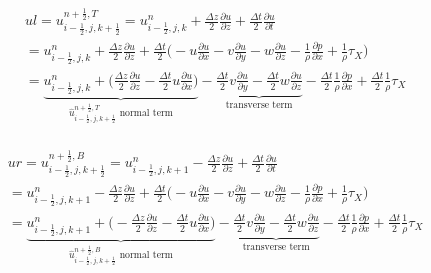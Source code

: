 \documentclass{article}
\numberwithin{equation}{subsection}
\begin{document}
\begin{align}
\begin{split}
& ul = u_{i-\frac{1}{2},j,k+\frac{1}{2}}^{n+\frac{1}{2},T} = u_{i-\frac{1}{2},j,k}^n + \frac{\Delta z}{2}\frac{\partial u}{\partial z} + \frac{\Delta t}{2}\frac{\partial u}{\partial t} \\
&= u_{i-\frac{1}{2},j,k}^n + \frac{\Delta z}{2} \frac{\partial u}{\partial z} + \frac{\Delta t}{2} \Big( -u\frac{\partial u}{\partial x} -v\frac{\partial u}{\partial y} -w\frac{\partial u}{\partial z} - \frac{1}{\rho}\frac{\partial p}{\partial x} +\frac{1}{\rho}\tau_X\Big) \\
&= \underbrace{u_{i-\frac{1}{2},j,k}^n + \Big(\frac{\Delta z}{2}\frac{\partial u}{\partial z} - \frac{\Delta t}{2} u\frac{\partial u}{\partial x}\Big)}_\text{$\widehat{u}_{i-\frac{1}{2},j,k+\frac{1}{2}}^{n+\frac{1}{2},T}$ normal term} -\underbrace{\frac{\Delta t}{2}v\frac{\partial u}{\partial y} - \frac{\Delta t}{2}w\frac{\partial u}{\partial z}}_\text{transverse term} - \frac{\Delta t}{2}\frac{1}{\rho}\frac{\partial p}{\partial x} + \frac{\Delta t}{2}\frac{1}{\rho}\tau_X
\end{split}
\end{align}

\begin{align}
\begin{split}
& ur = u_{i-\frac{1}{2},j,k+\frac{1}{2}}^{n+\frac{1}{2},B} = u_{i-\frac{1}{2},j,k+1}^n - \frac{\Delta z}{2}\frac{\partial u}{\partial z} + \frac{\Delta t}{2}\frac{\partial u}{\partial t} \\
&= u_{i-\frac{1}{2},j,k+1}^n - \frac{\Delta z}{2} \frac{\partial u}{\partial z} + \frac{\Delta t}{2} \Big( -u\frac{\partial u}{\partial x} -v\frac{\partial u}{\partial y} -w\frac{\partial u}{\partial z} - \frac{1}{\rho}\frac{\partial p}{\partial x} +\frac{1}{\rho}\tau_X\Big) \\
&= \underbrace{u_{i-\frac{1}{2},j,k+1}^n + \Big(-\frac{\Delta z}{2}\frac{\partial u}{\partial z} - \frac{\Delta t}{2} u\frac{\partial u}{\partial x}\Big)}_\text{$\widehat{u}_{i-\frac{1}{2},j,k+\frac{1}{2}}^{n+\frac{1}{2},B}$ normal term} -\underbrace{\frac{\Delta t}{2}v\frac{\partial u}{\partial y} - \frac{\Delta t}{2}w\frac{\partial u}{\partial z}}_\text{transverse term} - \frac{\Delta t}{2}\frac{1}{\rho}\frac{\partial p}{\partial x} + \frac{\Delta t}{2}\frac{1}{\rho}\tau_X
\end{split}
\end{align}



\end{document}
